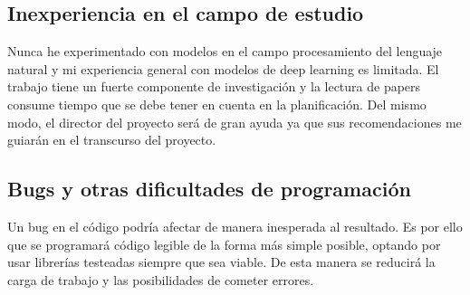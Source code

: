 \subsection{Inexperiencia en el campo de estudio}
Nunca he experimentado con modelos en el campo procesamiento del lenguaje natural
y mi experiencia general con modelos de deep learning es limitada. El trabajo tiene un fuerte componente
de investigación y la lectura de papers consume tiempo que se debe tener en cuenta en la
planificación.
Del mismo modo, el director del proyecto será de gran ayuda ya que sus recomendaciones me guiarán en el
transcurso del proyecto.
\subsection{Bugs y otras dificultades de programación}
Un bug en el código podría afectar de manera inesperada al resultado. Es por ello
que se programará código legible de la forma más simple posible, optando por usar librerías testeadas siempre
que sea viable. De esta manera se reducirá la carga de trabajo y las posibilidades de cometer errores.
